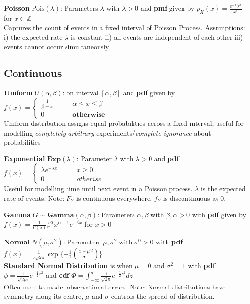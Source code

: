 \documentclass[5pt]{article}
\begin{document}
\begin{definition} 
\textbf{Poisson} $\text{Pois}(\lambda)$: Parameters $\lambda$ with $\lambda > 0$ and \textbf{pmf} given by $p_X(x) = \frac{e^{-\lambda}\lambda^x}{x!}$ for $x \in \mathbb{Z}^+$\\
Captures the count of events in a fixed interval of Poisson Process. Assumptions: i) the expected rate $\lambda$ is constant ii) all events are independent of each other iii) events cannot occur simultaneously
\end{definition}

\subsection{Continuous}
\begin{definition}
\textbf{Uniform} $U(\alpha,\beta)$: on interval $[\alpha,\beta]$ and \textbf{pdf} given by $f(x) = \begin{cases}
\frac{1}{\beta - \alpha} \qquad & \alpha \leq x \leq \beta\\
0 &\textbf{otherwise}
\end{cases}$\\
Uniform distribution assigns equal probabilities across a fixed interval, useful for modelling \emph{completely arbitrary} experiments/\emph{complete ignorance} about probabilities
\end{definition}

\begin{definition}
\textbf{Exponential} $\textbf{Exp}(\lambda)$: Parameter $\lambda$ with $\lambda > 0$ and \textbf{pdf} $f(x) = \begin{cases}
\lambda e^{-\lambda x} \qquad & x \geq 0\\
0 &otherise
\end{cases}$\\
Useful for modelling time until next event in a Poisson process. $\lambda$ is the expected rate of events. Note: $F_Y$ is continuous everywhere, $f_Y$ is discontinuous at 0.
\end{definition}

\begin{definition}
\textbf{Gamma} $G \sim \textbf{Gamma}(\alpha, \beta)$: Parameters $\alpha, \beta$ with $\beta, \alpha > 0$ with \textbf{pdf} given by $f(x)=\frac{1}{\Gamma(a)}\beta^\alpha x^{\alpha - 1} e^{-\beta x}$ for $x>0$\\
\end{definition}

\begin{definition}
\textbf{Normal} $N(\mu, \sigma^2)$: Parameters $\mu, \sigma^2$ with $\sigma^0 > 0$ with \textbf{pdf} $f(x)=\frac{1}{\sigma\sqrt{2\pi}}\exp{\{-\frac{1}{2}(\frac{x-\mu}{\sigma}^2)\}}$\\
\textbf{Standard Normal Distribution} is when $\mu = 0$ and $\sigma^2 = 1$ with \textbf{pdf} $\phi = \frac{1}{\sqrt{2pi}}e^{-\frac{1}{2}z^2}$ and \textbf{cdf} $\Phi = \int^a_{-\infty}\frac{1}{\sqrt{2\pi}}e^{-\frac{1}{2}z^2}dz$\\
Often used to model observational errors. Note: Normal distributions have symmetry along its centre, $\mu$ and $\sigma$ controls the spread of distribution.
\end{definition}
\end{document}
